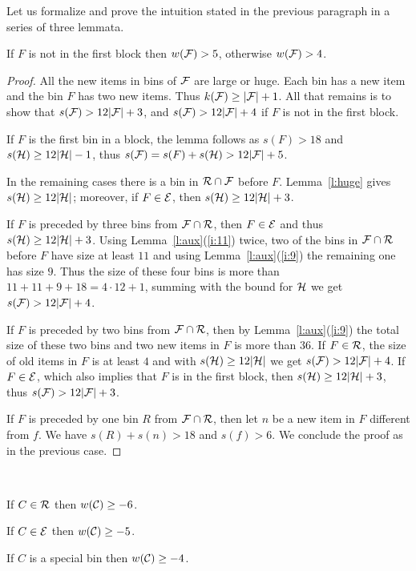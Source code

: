 Let us formalize and prove the intuition stated in the previous
paragraph in a series of three lemmata.

\begin{lem}
\label{l:f} 
If $F$ is not in the first block then $w({\mathcal F})>5$, otherwise $w({\mathcal F})>4$.
\end{lem}
\begin{proof}
All the new items in bins of ${\mathcal F}$ are large or huge. Each bin has a
new item and the bin $F$ has two new items. Thus $k({\mathcal F})\geq
|{\mathcal F}|+1$. All that remains is to show that $s({\mathcal F})>12|{\mathcal F}|+3$,
and $s({\mathcal F})>12|{\mathcal F}|+4$ if $F$ is not in the first block.

If $F$ is the first bin in a block, the lemma follows as $s(F)>18$ and
$s({\mathcal H})\geq12|{\mathcal H}|-1$, thus $s({\mathcal F})=s(F)+s({\mathcal H})>12|{\mathcal F}|+5$.

In the remaining cases there is a bin in ${\mathcal R}\cap{\mathcal F}$ before $F$.
Lemma~\ref{l:huge} gives $s({\mathcal H})\geq12|{\mathcal H}|$; moreover, if
$F\in{\mathcal E}$, then $s({\mathcal H})\geq12|{\mathcal H}|+3$.

If $F$ is preceded by three bins from ${\mathcal F}\cap{\mathcal R}$, then
$F\in{\mathcal E}$ and thus $s({\mathcal H})\geq12|{\mathcal H}|+3$. Using
Lemma~\ref{l:aux}(\ref{i:11}) twice, two of the bins in
${\mathcal F}\cap{\mathcal R}$ before $F$
have size at least $11$ and using Lemma~\ref{l:aux}(\ref{i:9}) the
remaining one has size $9$. Thus the size of these four bins is more
than $11+11+9+18=4\cdot12+1$, summing with the bound for ${\mathcal H}$ we get
$s({\mathcal F})>12|{\mathcal F}|+4$. 

If $F$ is preceded by two bins from ${\mathcal F}\cap{\mathcal R}$, then by
Lemma~\ref{l:aux}(\ref{i:9}) the total size of these two bins and two
new items in $F$ is more than $36$. If $F\in{\mathcal R}$, the size of old
items in $F$ is at least $4$ and with $s({\mathcal H})\geq12|{\mathcal H}|$ we get
$s({\mathcal F})>12|{\mathcal F}|+4$. 
If $F\in{\mathcal E}$, which also implies that $F$ is in the first block, then
$s({\mathcal H})\geq12|{\mathcal H}|+3$, thus $s({\mathcal F})>12|{\mathcal F}|+3$. 

If $F$ is preceded by one bin $R$ from ${\mathcal F}\cap{\mathcal R}$, then let $n$ be a
new item in $F$ different from $f$. We have $s(R)+s(n)>18$ and
$s(f)>6$. We conclude the proof as in the previous case.
\end{proof}

\begin{lem}
\label{l:c} ~

If $C\in{\mathcal R}$ then $w({\mathcal C})\geq -6$. 

If $C\in{\mathcal E}$ then $w({\mathcal C})\geq -5$. 

If $C$ is a special bin then $w({\mathcal C})\geq -4$.
\end{lem}

